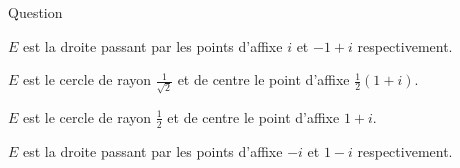 \begin{multi}[multiple,feedback=
{\(M(z), A(i)\) et \(B(iz)\) sont alignés si et seulement si les vecteurs \(\overrightarrow{AM}\) et \(\overrightarrow{AB}\)
sont colinéaires. On pose \(z=x+iy, \, x,y\in \Rr\). Les vecteurs \(\overrightarrow{AM}\) et \(\overrightarrow{AB}\) sont de coordonnées \((x,y-1)\) et \((-y,x-1)\) respectivement. \(M(x+iy) \in E\) si et seulement si  \(\det(\overrightarrow{AM},   \overrightarrow{AB})=0\). 
}]{Question}
    \item \(E\) est la droite passant par les points d'affixe \(i\) et \(-1+i\) respectivement.
    \item* \(E\) est le cercle de rayon \(\frac{1}{\sqrt 2}\)  et de centre le point d'affixe \(\frac{1}{2}(1+i)\).
    \item \(E\) est le cercle de rayon \(\frac{1}{2}\)  et de centre le point d'affixe \(1+i\).
    \item \(E\) est la droite passant par les points d'affixe \(-i\) et \(1-i\) respectivement.
\end{multi}
